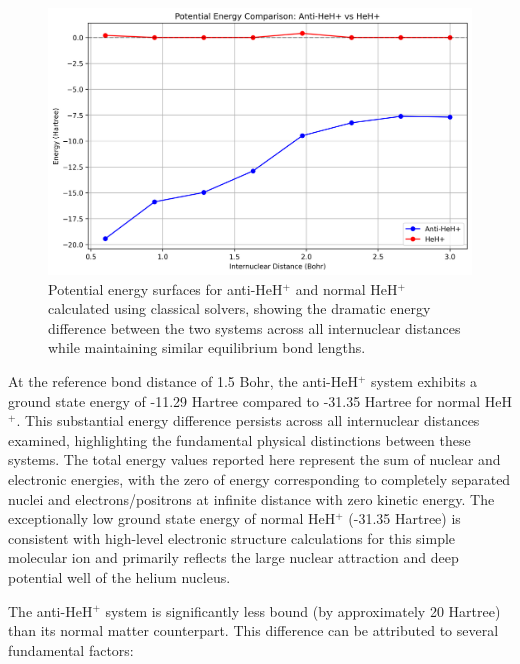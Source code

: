 \documentclass[10pt,twocolumn,a4paper]{article}
\begin{document}
\begin{figure}[t!]
    \centering
    \includegraphics[width=\columnwidth]{graphs/corrected_comparison_pes.png}
    \caption{Potential energy surfaces for anti-HeH$^+$ and normal HeH$^+$ calculated using classical solvers, showing the dramatic energy difference between the two systems across all internuclear distances while maintaining similar equilibrium bond lengths.}
    \label{fig:pes_comparison}
\end{figure}

At the reference bond distance of 1.5 Bohr, the anti-HeH$^+$ system exhibits a ground state energy of -11.29 Hartree compared to -31.35 Hartree for normal HeH$^+$. This substantial energy difference persists across all internuclear distances examined, highlighting the fundamental physical distinctions between these systems. The total energy values reported here represent the sum of nuclear and electronic energies, with the zero of energy corresponding to completely separated nuclei and electrons/positrons at infinite distance with zero kinetic energy. The exceptionally low ground state energy of normal HeH$^+$ (-31.35 Hartree) is consistent with high-level electronic structure calculations for this simple molecular ion and primarily reflects the large nuclear attraction and deep potential well of the helium nucleus.

The anti-HeH$^+$ system is significantly less bound (by approximately 20 Hartree) than its normal matter counterpart. This difference can be attributed to several fundamental factors:
\end{document}
